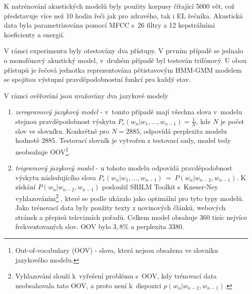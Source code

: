 
K natrénování akustických modelů byly použity korpusy čítající 5000 vět,
což představuje více než 10 hodin řeči jak pro zdravého, tak i EL řečníka.
Akustická data byla parametrizována pomocí MFCC s~26 filtry a 12 kepstrálními koeficienty a energií.

V rámci experimentu byly otestovány dva přístupy.
V prvním případě se jednalo o monofónový akustický model, v~druhém případě byl testován trifónový.
U obou přístupů je řečová jednotka reprezentována pětistavovým HMM-GMM modelem se spojitou výstupní pravděpodobnostní funkcí pro každý stav.

V rámci ověřování jsou uvažovány dva jazykové modely

\begin{enumerate}
  \item \textit{zerogramový jazykový model} - v~tomto případě mají všechna slova v~modelu stejnou pravděpodobnost výskytu $P_r(w_n|w_1,\dots,w_{n-1}) = \frac{1}{N}$, kde $N$ je počet slov ve slovníku. Konkrétně pro $N = 2885$, odpovídá perplexita modelu hodnotě $2885$. Testovací slovník je vytvořen z testovací sady, model tedy neobsahuje OOV\footnote{Out-of-vocabulary (OOV) - slova, která nejsou obsažena ve slovníku jazykového modelu.}.
  \item \textit{trigramový jazykový model} - u tohoto modelu odpovídá pravděpodobnost výskytu následujícího slova $P_r(w_n|w_1,\dots,w_{n-1})~=~P(w_n|w_{n-2}, w_{n-1})$. K získání $P(w_n|w_{n-2}, w_{n-1})$ posloužil SRILM Toolkit s~Kneser-Ney vyhlazováním\footnote{Vyhlazování slouží  k~vyřešení problému s~OOV, kdy trénovací data neobsahovala tato OOV, a proto není  k~dispozici $p(w_n|w_{n-2}, w_{n-1})$.} \cite{Stolcke2002}, které se podle \cite{Prazak2008} ukázalo jako optimální pro tyto typy modelů. Jako trénovací data byly použity texty z novinových článků, webových stránek a přepisů televizních pořadů. Celkem model obsahuje 360 tisíc nejvíce frekventovaných slov. OOV bylo $3,8 \%$ a perplexita $3380$.
\end{enumerate}

